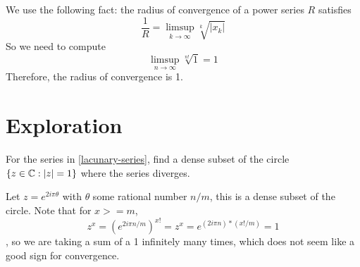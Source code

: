 \documentclass{homework}
\begin{document}
                                \begin{solution}
                                We use the following fact: the radius of convergence of a power series $R$ satisfies
                                \[\frac{1}{R} = \limsup_{k\to \infty} \sqrt[k]{|x_k|}\]
                                So we need to compute 
                                \[\limsup_{n\to \infty} \sqrt[n!]{1} = 1\]
                                Therefore, the radius of convergence is 1.
                                \end{solution}

                                \section{Exploration}

                                \begin{problem}For the series in \ref{lacunary-series}, find a dense
                                  subset of the circle $\{ z \in \mathbb{C} : \left|z\right| = 1 \}$ where the series
                                    diverges.
                                    \end{problem}
                                    \begin{solution}
                                    Let $z=e^{2i\pi \theta}$ with $\theta$ some rational number $n/m$, this is a dense subset of the circle. Note that for $x>=m$, 
                                    \[z^x = (e^{2i\pi n/m})^{x!} = z^x = e^{(2i\pi n)*(x!/m)} = 1\],
                                    so we are taking a sum of a 1 infinitely many times, which does not seem like a good sign for convergence.
                                    \end{solution} 
\end{document}
